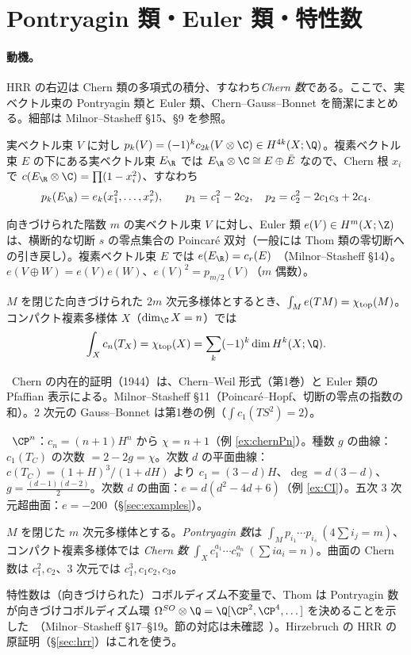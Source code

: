 \section{Pontryagin 類・Euler 類・特性数}\label{sec:pont}
\paragraph{動機。}HRR の右辺は Chern 類の多項式の積分、すなわち\emph{Chern 数}である。ここで、実ベクトル束の Pontryagin 類と Euler 類、Chern--Gauss--Bonnet を簡潔にまとめる。細部は Milnor--Stasheff §15、§9 を参照。
\begin{defn}[Pontryagin 類]\label{def:pont}
実ベクトル束 $V$ に対し $p_k(V)=(-1)^kc_{2k}(V\otimes\C)\in H^{4k}(X;\Q)$。複素ベクトル束 $E$ の下にある実ベクトル束 $E_\R$ では $E_\R\otimes\C\cong E\oplus\bar E$ なので、Chern 根 $x_i$ で $c(E_\R\otimes\C)=\prod(1-x_i^2)$、すなわち
\[
p_k(E_\R)=e_k(x_1^2,\dots,x_r^2),\qquad p_1=c_1^2-2c_2,\quad p_2=c_2^2-2c_1c_3+2c_4.
\]
\end{defn}
\begin{defn}[Euler 類]\label{def:euler}
向きづけられた階数 $m$ の実ベクトル束 $V$ に対し、Euler 類 $e(V)\in H^m(X;\Z)$ は、横断的な切断 $s$ の零点集合の Poincaré 双対（一般には Thom 類の零切断への引き戻し）。複素ベクトル束 $E$ では $e(E_\R)=c_r(E)$\tC\ （Milnor--Stasheff §14）。$e(V\oplus W)=e(V)e(W)$、$e(V)^2=p_{m/2}(V)$（$m$ 偶数）。
\end{defn}
\begin{thm}\label{thm:CGB}
$M$ を閉じた向きづけられた $2m$ 次元多様体とするとき、$\int_Me(TM)=\chi_{\rm top}(M)$。コンパクト複素多様体 $X$（$\dim_\C X=n$）では
\[
\int_Xc_n(T_X)=\chi_{\rm top}(X)=\sum_k(-1)^k\dim H^k(X;\Q).
\]
\end{thm}
\noindent\tC\ Chern の内在的証明（1944）は、Chern--Weil 形式（第1巻）と Euler 類の Pfaffian 表示による。Milnor--Stasheff §11（Poincaré--Hopf、切断の零点の指数の和）。2 次元の Gauss--Bonnet は第1巻の例（$\int c_1(TS^2)=2$）。

\begin{ex}\label{ex:euler}\tP\
$\CP^n$：$c_n=(n+1)H^n$ から $\chi=n+1$（例 \ref{ex:chernPn}）。種数 $g$ の曲線：$c_1(T_C)$ の次数 $=2-2g=\chi$。次数 $d$ の平面曲線：$c(T_C)=(1+H)^3/(1+dH)$ より $c_1=(3-d)H$、$\deg=d(3-d)$、$g=\frac{(d-1)(d-2)}2$。次数 $d$ の曲面：$e=d(d^2-4d+6)$（例 \ref{ex:CI}）。五次 3 次元超曲面：$e=-200$（\S\ref{sec:examples}）。
\end{ex}
\begin{defn}[特性数]\label{def:charnum}
$M$ を閉じた $m$ 次元多様体とする。\emph{Pontryagin 数}は $\int_Mp_{i_1}\cdots p_{i_s}\ (4\sum i_j=m)$、コンパクト複素多様体では \emph{Chern 数} $\int_Xc_1^{a_1}\cdots c_n^{a_n}\ (\sum ia_i=n)$。曲面の Chern 数は $c_1^2,c_2$、3 次元では $c_1^3,c_1c_2,c_3$。
\end{defn}
\noindent 特性数は（向きづけられた）コボルディズム不変量で、Thom は Pontryagin 数が向きづけコボルディズム環 $\Omega^{SO}\otimes\Q=\Q[\CP^2,\CP^4,\dots]$ を決めることを示した\tC\ （Milnor--Stasheff §17--§19。節の対応は未確認\tQ\ ）。Hirzebruch の HRR の原証明（\S\ref{sec:hrr}）はこれを使う。

